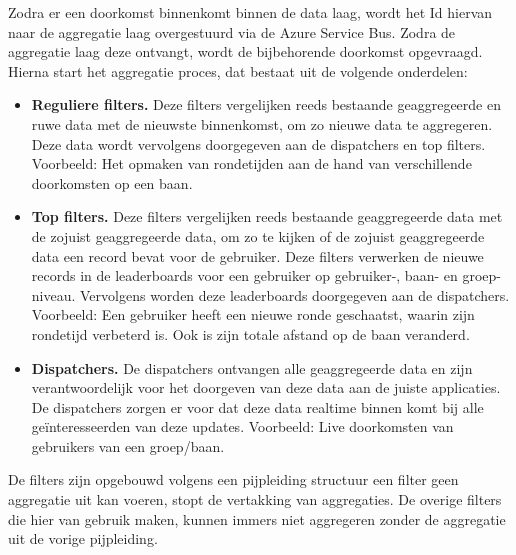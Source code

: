 Zodra er een doorkomst binnenkomt binnen de data laag, wordt het Id hiervan naar de aggregatie laag overgestuurd via de Azure Service Bus. Zodra de aggregatie laag deze ontvangt, wordt de bijbehorende doorkomst opgevraagd. Hierna start het aggregatie proces, dat bestaat uit de volgende onderdelen:

\begin{itemize}
\item \textbf{Reguliere filters.}
Deze filters vergelijken reeds bestaande geaggregeerde en ruwe data met de nieuwste binnenkomst, om zo nieuwe data te aggregeren. Deze data wordt vervolgens doorgegeven aan de dispatchers en top filters. Voorbeeld: Het opmaken van rondetijden aan de hand van verschillende doorkomsten op een baan.
\item \textbf{Top filters.}
Deze filters vergelijken reeds bestaande geaggregeerde data met de zojuist geaggregeerde data, om zo te kijken of de zojuist geaggregeerde data een record bevat voor de gebruiker. Deze filters verwerken de nieuwe records in de leaderboards voor een gebruiker op gebruiker-, baan- en groep-niveau. Vervolgens worden deze leaderboards doorgegeven aan de dispatchers. Voorbeeld: Een gebruiker heeft een nieuwe ronde geschaatst, waarin zijn rondetijd verbeterd is. Ook is zijn totale afstand op de baan veranderd. 
\item \textbf{Dispatchers.}
De dispatchers ontvangen alle geaggregeerde data en zijn verantwoordelijk voor het doorgeven van deze data aan de juiste applicaties. De dispatchers zorgen er voor dat deze data realtime binnen komt bij alle geïnteresseerden van deze updates. 
Voorbeeld: Live doorkomsten van gebruikers van een groep/baan. 
\end{itemize}

De filters zijn opgebouwd volgens een pijpleiding structuur een filter geen aggregatie uit kan voeren, stopt de vertakking van aggregaties. De overige filters die hier van gebruik maken, kunnen immers niet aggregeren zonder de aggregatie uit de vorige pijpleiding.

